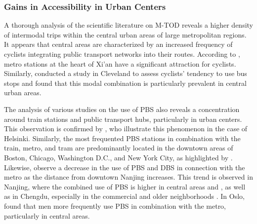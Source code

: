 \begin{refsegment}
\subsubsection*{Gains in Accessibility in Urban Centers
    \label{chap2:gains-accessibilite-urbain}
    }

A thorough analysis of the scientific literature on \acrshort{M-TOD} reveals a higher density of intermodal trips within the central urban areas of large metropolitan regions. It appears that central areas are characterized by an increased frequency of cyclists integrating public transport networks into their routes. According to \textcolor{blue}{\textcite[5]{zhu_improved_2021}}, metro stations at the heart of Xi'an have a significant attraction for cyclists. Similarly, \textcolor{blue}{\textcite[79-81]{flamm_determinants_2013}} conducted a study in Cleveland to assess cyclists' tendency to use bus stops and found that this modal combination is particularly prevalent in central urban areas.%

The analysis of various studies on the use of \acrshort{PBS} also reveals a concentration around train stations and public transport hubs, particularly in urban centers. This observation is confirmed by \textcolor{blue}{\textcite[23]{jappinen_modelling_2013}}, who illustrate this phenomenon in the case of Helsinki. Similarly, the most frequented \acrshort{PBS} stations in combination with the train, metro, and tram are predominantly located in the downtown areas of Boston, Chicago, Washington D.C., and New York City, as highlighted by \textcolor{blue}{\textcite[11]{kong_deciphering_2020}}. Likewise, \textcolor{blue}{\textcite[14]{chen_what_2022}} observe a decrease in the use of \acrshort{PBS} and \acrshort{DBS} in connection with the metro as the distance from downtown Nanjing increases. This trend is observed in Nanjing, where the combined use of \acrshort{PBS} is higher in central areas and  \textcolor{blue}{\autocite[8-9]{cheng_promoting_2022}}, as well as in Chengdu, especially in the commercial and older neighborhoods \textcolor{blue}{\autocite[884]{bi_analysis_2021}}. In Oslo, \textcolor{blue}{\textcite[394]{bocker_bike_2020}} found that men more frequently use \acrshort{PBS} in combination with the metro, particularly in central areas.%


\end{refsegment}
